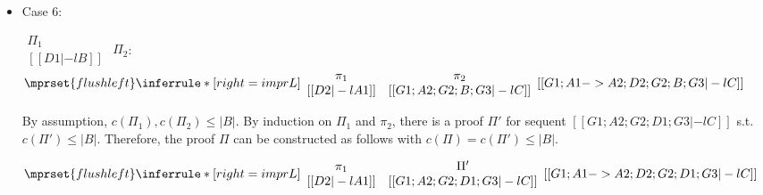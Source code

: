 \begin{itemize}
\item Case 6:
      \begin{center}
        \scriptsize
        \begin{math}
          \begin{array}{c}
            \Pi_1 \\
            {[[D1 |-l B]]}
          \end{array}
        \end{math}
        \qquad\qquad
        $\Pi_2$:
        \begin{math}
          $$\mprset{flushleft}
          \inferrule* [right={\tiny imprL}] {
            {
              \begin{array}{cc}
                \pi_1 & \pi_2 \\
                {[[D2 |-l A1]]} & {[[G1; A2; G2; B; G3 |-l C]]}
              \end{array}
            }
          }{[[G1; A1 -> A2; D2; G2; B; G3 |-l C]]}
        \end{math}
      \end{center}
      By assumption, $c(\Pi_1),c(\Pi_2)\leq |B|$. By induction on $\Pi_1$
      and $\pi_2$, there is a proof $\Pi'$ for sequent
      $[[G1; A2; G2; D1; G3 |-l C]]$ s.t. $c(\Pi') \leq |B|$. Therefore,
      the proof $\Pi$ can be constructed as follows with
      $c(\Pi) = c(\Pi') \leq |B|$.
      \begin{center}
        \scriptsize
        \begin{math}
          $$\mprset{flushleft}
          \inferrule* [right={\tiny imprL}] {
            {
              \begin{array}{cc}
                \pi_1 & \Pi' \\
                {[[D2 |-l A1]]} & {[[G1; A2; G2; D1; G3 |-l C]]}
              \end{array}
            }
          }{[[G1; A1 -> A2; D2; G2; D1; G3 |-l C]]}
        \end{math}
      \end{center}
\end{itemize}


